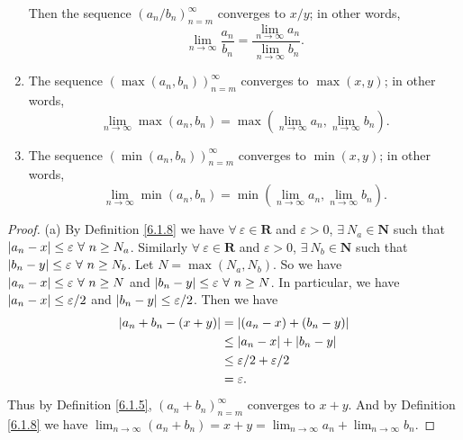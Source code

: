 \begin{theorem}
\begin{enumerate}
              Then the sequence \((a_n / b_n)_{n = m}^\infty\) converges to \(x / y\);
              in other words,
              \[
                  \lim_{n \to \infty} \frac{a_n}{b_n} = \frac{\lim_{n \to \infty} a_n}{\lim_{n \to \infty} b_n}.
              \]
        \item The sequence \((\max(a_n, b_n))_{n = m}^\infty\) converges to \(\max(x, y)\);
              in other words,
              \[
                  \lim_{n \to \infty} \max(a_n, b_n) = \max(\lim_{n \to \infty} a_n, \lim_{n \to \infty} b_n).
              \]
        \item The sequence \((\min(a_n, b_n))_{n = m}^\infty\) converges to \(\min(x, y)\);
              in other words,
              \[
                  \lim_{n \to \infty} \min(a_n, b_n) = \min(\lim_{n \to \infty} a_n, \lim_{n \to \infty} b_n).
              \]
    \end{enumerate}
\end{theorem}

\begin{proof}{(a)}
    By Definition \ref{6.1.8} we have \(\forall\ \varepsilon \in \mathbf{R}\) and \(\varepsilon > 0\), \(\exists\ N_a \in \mathbf{N}\) such that \(\abs*{a_n - x} \leq \varepsilon \ \forall\ n \geq N_a\).
    Similarly \(\forall\ \varepsilon \in \mathbf{R}\) and \(\varepsilon > 0\), \(\exists\ N_b \in \mathbf{N}\) such that \(\abs*{b_n - y} \leq \varepsilon \ \forall\ n \geq N_b\).
    Let \(N = \max(N_a, N_b)\).
    So we have \(\abs*{a_n - x} \leq \varepsilon \ \forall\ n \geq N\) and \(\abs*{b_n - y} \leq \varepsilon \ \forall\ n \geq N\).
    In particular, we have \(\abs*{a_n - x} \leq \varepsilon / 2\) and \(\abs*{b_n - y} \leq \varepsilon / 2\).
    Then we have
    \begin{align*}
        \abs*{a_n + b_n - (x + y)} & = \abs*{(a_n - x) + (b_n - y)}         \\
                                   & \leq \abs*{a_n - x} + \abs*{b_n - y}   \\
                                   & \leq \varepsilon / 2 + \varepsilon / 2 \\
                                   & = \varepsilon.
    \end{align*}
    Thus by Definition \ref{6.1.5}, \((a_n + b_n)_{n = m}^\infty\) converges to \(x + y\).
    And by Definition \ref{6.1.8} we have \(\lim_{n \to \infty} (a_n + b_n) = x + y = \lim_{n \to \infty} a_n + \lim_{n \to \infty} b_n\).
\end{proof}

